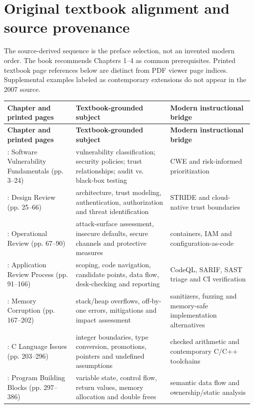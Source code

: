 \documentclass[10pt,letterpaper]{article}
\begin{document}
\section{Original textbook alignment and source provenance}
The source-derived sequence is the preface selection, not an invented modern order. The book recommends Chapters 1--4 as common prerequisites. Printed textbook page references below are distinct from PDF viewer page indices. Supplemental examples labeled as contemporary extensions do not appear in the 2007 source.

\begingroup\footnotesize\setlength\tabcolsep{3pt}
\begin{longtable}{>{\raggedright\arraybackslash}p{}>{\raggedright\arraybackslash}p{}>{\raggedright\arraybackslash}p{}}\toprule
\textbf{Chapter and printed pages} & \textbf{Textbook-grounded subject} & \textbf{Modern instructional bridge}\\\midrule\endfirsthead
\toprule \textbf{Chapter and printed pages} & \textbf{Textbook-grounded subject} & \textbf{Modern instructional bridge}\\\midrule\endhead
1: Software Vulnerability Fundamentals (pp. 3--24) & vulnerability classification; security policies; trust relationships; audit vs. black-box testing & CWE and risk-informed prioritization\\\midrule
2: Design Review (pp. 25--66) & architecture, trust modeling, authentication, authorization and threat identification & STRIDE and cloud-native trust boundaries\\\midrule
3: Operational Review (pp. 67--90) & attack-surface assessment, insecure defaults, secure channels and protective measures & containers, IAM and configuration-as-code\\\midrule
4: Application Review Process (pp. 91--166) & scoping, code navigation, candidate points, data flow, desk-checking and reporting & CodeQL, SARIF, SAST triage and CI verification\\\midrule
5: Memory Corruption (pp. 167--202) & stack/heap overflows, off-by-one errors, mitigations and impact assessment & sanitizers, fuzzing and memory-safe implementation alternatives\\\midrule
6: C Language Issues (pp. 203--296) & integer boundaries, type conversion, promotions, pointers and undefined assumptions & checked arithmetic and contemporary C/C++ toolchains\\\midrule
7: Program Building Blocks (pp. 297--386) & variable state, control flow, return values, memory allocation and double frees & semantic data flow and ownership/static analysis\\\midrule

\end{longtable}
\end{document}
